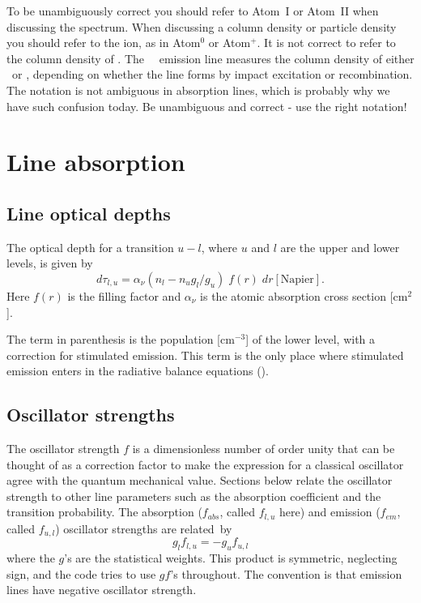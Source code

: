 To be unambiguously correct you should refer to Atom~I or Atom~II when
discussing the spectrum.
When discussing a column density or particle
density you should refer to the ion, as in Atom$^0$ or Atom$^+$.
It is not correct
to refer to the column density of \hi.
The \la\ \hi\  emission
line measures the column density of either \hO\ or \hplus,
depending on whether the line forms by impact excitation or recombination.
The notation is not ambiguous in absorption lines, which is probably why
we have such confusion today.
Be unambiguous and correct - use the right notation!

\section{Line absorption }

\subsection{Line optical depths}

The optical depth for a transition $u-l$,  where $u$ and $l$ are the upper
and lower levels, is given by
\begin{equation}
\label{eqn:OpticalDepthIncrement}
d{\tau _{l,u}} = {\alpha _\nu }\left( {{n_l} - {n_u}{g_l}/{g_u}}
\right)\;f(r)\;dr
 [\mathrm{Napier}].
\end{equation}
Here $f (r)$ is the filling factor and $\alpha _\nu$ is the
atomic absorption cross section [cm$^2$].

The term in parenthesis is the population [cm$^{-3}$] of the lower level,
with a correction for stimulated emission.
This term is the only place where
stimulated emission enters in the radiative balance equations (\citealp{Elitzur1983}).

\subsection{Oscillator strengths}

The oscillator strength $f$ is a dimensionless number of order unity that
can be thought of as a correction factor to make the expression for a
classical oscillator agree with the quantum mechanical value.
Sections
below relate the oscillator strength to other line parameters such as the
absorption coefficient and the transition probability.
The absorption
($f_{abs}$,
called $f_{l,u}$ here) and emission ($f_{em}$, called $f_{u,l}$)
oscillator strengths are related~by
\begin{equation}
{g_l}{f_{l,u}} =  - {g_u}{f_{u,l}}%
\end{equation}
where the $g$'s are the statistical weights.
This product is symmetric,
neglecting sign, and the code tries to use $gf$'s throughout.
The convention
is that emission lines have negative oscillator strength.

